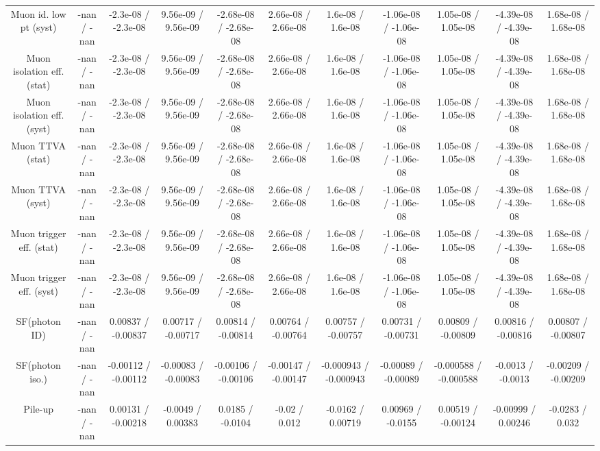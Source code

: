 \begin{table}[htbp]
\begin{center}
\begin{tabular}{|c|c|c|c|c|c|c|c|c|c|c|}
  Muon id. low pt (syst) & -nan / -nan & -2.3e-08 / -2.3e-08 & 9.56e-09 / 9.56e-09 & -2.68e-08 / -2.68e-08 & 2.66e-08 / 2.66e-08 & 1.6e-08 / 1.6e-08 & -1.06e-08 / -1.06e-08 & 1.05e-08 / 1.05e-08 & -4.39e-08 / -4.39e-08 & 1.68e-08 / 1.68e-08 \\ 
  Muon isolation eff. (stat) & -nan / -nan & -2.3e-08 / -2.3e-08 & 9.56e-09 / 9.56e-09 & -2.68e-08 / -2.68e-08 & 2.66e-08 / 2.66e-08 & 1.6e-08 / 1.6e-08 & -1.06e-08 / -1.06e-08 & 1.05e-08 / 1.05e-08 & -4.39e-08 / -4.39e-08 & 1.68e-08 / 1.68e-08 \\ 
  Muon isolation eff. (syst) & -nan / -nan & -2.3e-08 / -2.3e-08 & 9.56e-09 / 9.56e-09 & -2.68e-08 / -2.68e-08 & 2.66e-08 / 2.66e-08 & 1.6e-08 / 1.6e-08 & -1.06e-08 / -1.06e-08 & 1.05e-08 / 1.05e-08 & -4.39e-08 / -4.39e-08 & 1.68e-08 / 1.68e-08 \\ 
  Muon TTVA (stat) & -nan / -nan & -2.3e-08 / -2.3e-08 & 9.56e-09 / 9.56e-09 & -2.68e-08 / -2.68e-08 & 2.66e-08 / 2.66e-08 & 1.6e-08 / 1.6e-08 & -1.06e-08 / -1.06e-08 & 1.05e-08 / 1.05e-08 & -4.39e-08 / -4.39e-08 & 1.68e-08 / 1.68e-08 \\ 
  Muon TTVA (syst) & -nan / -nan & -2.3e-08 / -2.3e-08 & 9.56e-09 / 9.56e-09 & -2.68e-08 / -2.68e-08 & 2.66e-08 / 2.66e-08 & 1.6e-08 / 1.6e-08 & -1.06e-08 / -1.06e-08 & 1.05e-08 / 1.05e-08 & -4.39e-08 / -4.39e-08 & 1.68e-08 / 1.68e-08 \\ 
  Muon trigger eff. (stat) & -nan / -nan & -2.3e-08 / -2.3e-08 & 9.56e-09 / 9.56e-09 & -2.68e-08 / -2.68e-08 & 2.66e-08 / 2.66e-08 & 1.6e-08 / 1.6e-08 & -1.06e-08 / -1.06e-08 & 1.05e-08 / 1.05e-08 & -4.39e-08 / -4.39e-08 & 1.68e-08 / 1.68e-08 \\ 
  Muon trigger eff. (syst) & -nan / -nan & -2.3e-08 / -2.3e-08 & 9.56e-09 / 9.56e-09 & -2.68e-08 / -2.68e-08 & 2.66e-08 / 2.66e-08 & 1.6e-08 / 1.6e-08 & -1.06e-08 / -1.06e-08 & 1.05e-08 / 1.05e-08 & -4.39e-08 / -4.39e-08 & 1.68e-08 / 1.68e-08 \\ 
  SF(photon ID) & -nan / -nan & 0.00837 / -0.00837 & 0.00717 / -0.00717 & 0.00814 / -0.00814 & 0.00764 / -0.00764 & 0.00757 / -0.00757 & 0.00731 / -0.00731 & 0.00809 / -0.00809 & 0.00816 / -0.00816 & 0.00807 / -0.00807 \\ 
  SF(photon iso.) & -nan / -nan & -0.00112 / -0.00112 & -0.00083 / -0.00083 & -0.00106 / -0.00106 & -0.00147 / -0.00147 & -0.000943 / -0.000943 & -0.00089 / -0.00089 & -0.000588 / -0.000588 & -0.0013 / -0.0013 & -0.00209 / -0.00209 \\ 
  Pile-up & -nan / -nan & 0.00131 / -0.00218 & -0.0049 / 0.00383 & 0.0185 / -0.0104 & -0.02 / 0.012 & -0.0162 / 0.00719 & 0.00969 / -0.0155 & 0.00519 / -0.00124 & -0.00999 / 0.00246 & -0.0283 / 0.032 \\ 

\end{tabular}
\end{center}
\end{table}
